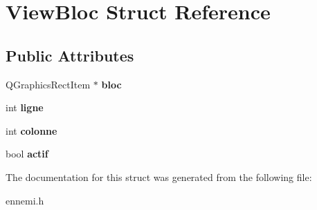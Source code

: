 \hypertarget{struct_view_bloc}{}\section{View\+Bloc Struct Reference}
\label{struct_view_bloc}
\subsection*{Public Attributes}
\begin{DoxyCompactItemize}
\item 
\hypertarget{struct_view_bloc_ab74d0b50db8e8192f57ccb20230e91a5}{}Q\+Graphics\+Rect\+Item $\ast$ {\bfseries bloc}\label{struct_view_bloc_ab74d0b50db8e8192f57ccb20230e91a5}

\item 
\hypertarget{struct_view_bloc_a21a08ca97a38931922470ac659e2bb87}{}int {\bfseries ligne}\label{struct_view_bloc_a21a08ca97a38931922470ac659e2bb87}

\item 
\hypertarget{struct_view_bloc_ad8d6fb47578f75851b24cfad0b2b148c}{}int {\bfseries colonne}\label{struct_view_bloc_ad8d6fb47578f75851b24cfad0b2b148c}

\item 
\hypertarget{struct_view_bloc_ab5a32c28b94753500f254eb88276264c}{}bool {\bfseries actif}\label{struct_view_bloc_ab5a32c28b94753500f254eb88276264c}

\end{DoxyCompactItemize}


The documentation for this struct was generated from the following file\+:\begin{DoxyCompactItemize}
\item 
ennemi.\+h\end{DoxyCompactItemize}
